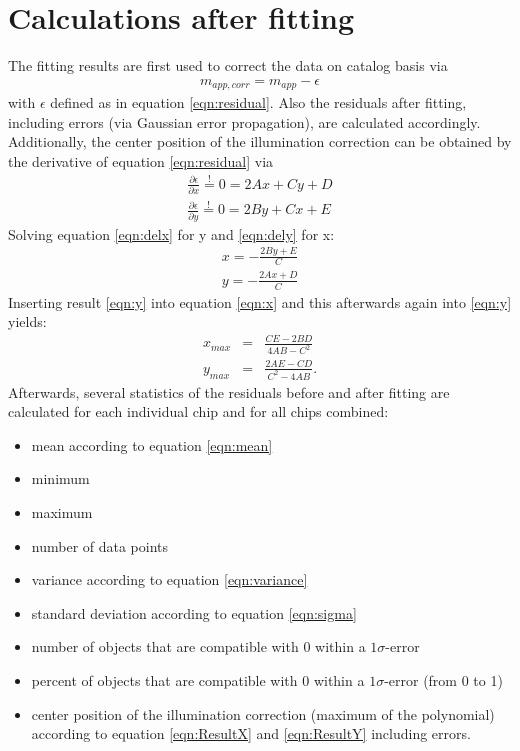 \chapter{Calculations after fitting}
\label{ch:IllumCorrectionCalcsAfterFitting}
The fitting results are first used to correct the data on catalog basis via
\begin{eqnarray}
m_{app,corr} = m_{app} - \epsilon
\end{eqnarray}
with $\epsilon$ defined as in equation \ref{eqn:residual}. Also the residuals after fitting, including errors (via Gaussian error propagation), are calculated accordingly.\\
Additionally, the center position of the illumination correction can be obtained by the derivative of equation \ref{eqn:residual} via
\begin{eqnarray}
\frac{\partial \epsilon}{\partial x}  \stackrel{!}= 0 = 2Ax + Cy + D\label{eqn:delx} \\
\frac{\partial \epsilon}{\partial y}  \stackrel{!}= 0 = 2By + Cx + E\label{eqn:dely}
\end{eqnarray}
Solving equation \ref{eqn:delx} for y and \ref{eqn:dely} for x:
\begin{eqnarray}
x = -\frac{2By + E}{C}\label{eqn:x}\\
y = -\frac{2Ax + D}{C}\label{eqn:y}
\end{eqnarray}
Inserting result \ref{eqn:y} into equation \ref{eqn:x} and this afterwards again into \ref{eqn:y} yields:
\begin{eqnarray}
x_{max} & = & \frac{CE-2BD}{4AB-C^{2}}\label{eqn:ResultX}\\
y_{max} & = & \frac{2AE-CD}{C^{2}-4AB}\label{eqn:ResultY} .
\end{eqnarray}
Afterwards, several statistics of the residuals before and after fitting are calculated for each individual chip and for all chips combined:
\begin{itemize}
\item mean according to equation \ref{eqn:mean}
\item minimum
\item maximum
\item number of data points
\item variance according to equation \ref{eqn:variance}
\item standard deviation according to equation \ref{eqn:sigma}
\item number of objects that are compatible with 0 within a $1\sigma$-error
\item percent of objects that are compatible with 0 within a $1\sigma$-error (from 0 to 1)
\item center position of the illumination correction (maximum of the polynomial) according to equation \ref{eqn:ResultX} and \ref{eqn:ResultY} including errors.
\end{itemize}
